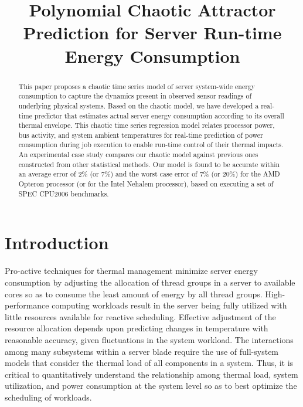 \documentclass[times,10pt,finalversion]{usetex-v1}
\begin{document}
 
\title{Polynomial Chaotic Attractor Prediction for Server Run-time Energy
  Consumption} 
\author{
   }
\maketitle 
\thispagestyle{empty}
\begin{abstract}
\begin{small}
  This paper proposes a chaotic time series model of server system-wide
  energy consumption to capture the dynamics present in observed sensor
  readings of underlying physical systems.  Based on the chaotic model,
  we have developed a real-time predictor that estimates actual server
  energy consumption according to its overall thermal envelope.  This
  chaotic time series regression model relates processor power, bus
  activity, and system ambient temperatures for real-time prediction of
  power consumption during job execution to enable run-time control of
  their thermal impacts. An experimental case study compares our chaotic
  model against previous ones constructed from other statistical
  methods.  Our model is found to be accurate within an average error of
  2\% (or 7\%) and the worst case error of 7\% (or 20\%) for the AMD Opteron
  processor (or for the Intel Nehalem processor), based on executing a
  set of SPEC CPU2006 benchmarks.
\end{small}
\end{abstract}
\section{Introduction}
\label{sec:Introduction}
Pro-active techniques for thermal management minimize server energy
consumption by adjusting the allocation of thread groups in a server to
available cores so as to consume the least amount of energy by all
thread groups. High-performance computing workloads result in the server
being fully utilized with little resources available for reactive
scheduling.  Effective adjustment of the resource allocation depends
upon predicting changes in temperature with reasonable accuracy, given
fluctuations in the system workload.  The interactions among many
subsystems within a server blade require the use of full-system models
that consider the thermal load of all components in a system. Thus, it
is critical to quantitatively understand the relationship among
thermal load, system utilization, and power consumption at the system
level so as to best optimize the scheduling of workloads.
\end{document}
